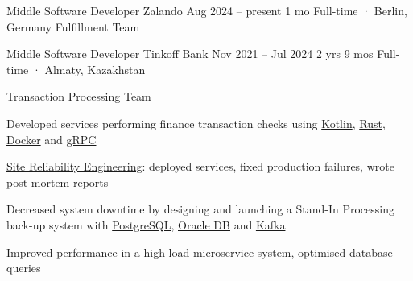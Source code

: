 \documentclass[11pt, a4paper]{style}
\begin{document}
\setcolumnwidth{5.5cm,2.7cm}
\begin{paracol}{2}



    \cvEntry
        {Middle Software Developer} {Zalando}
        {Aug 2024 -- present} {1 mo}
        {Full-time · Berlin, Germany}
        {
            Fulfillment Team \\
            \vspace{-5mm}
        }

    \cvEntry
        {Middle Software Developer} {Tinkoff Bank}
        {Nov 2021 -- Jul 2024} {2 yrs 9 mos}
        {Full-time · Almaty, Kazakhstan}
        {
            Transaction Processing Team \\
            \vspace{-5mm}
            \begin{cvItems}
                \item Developed services performing finance transaction checks using \underline{Kotlin}, \underline{Rust}, \underline{Docker} and \underline{gRPC}
                \item \underline{Site Reliability Engineering}: deployed services, fixed production failures, wrote post-mortem reports
                \item Decreased system downtime by designing and launching a Stand-In Processing back-up system with \underline{PostgreSQL}, \underline{Oracle DB} and \underline{Kafka}
                \item Improved performance in a high-load microservice system, optimised database queries
            \end{cvItems}
        }


\end{paracol}
\end{document}
